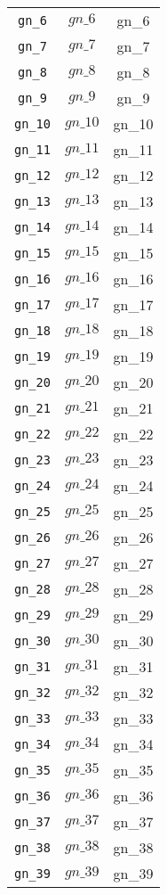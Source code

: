 \begin{center}
\begin{longtable}{ccc}
\texttt{gn\_6} & $gn\_6$ & gn\_6\\
\texttt{gn\_7} & $gn\_7$ & gn\_7\\
\texttt{gn\_8} & $gn\_8$ & gn\_8\\
\texttt{gn\_9} & $gn\_9$ & gn\_9\\
\texttt{gn\_10} & $gn\_10$ & gn\_10\\
\texttt{gn\_11} & $gn\_11$ & gn\_11\\
\texttt{gn\_12} & $gn\_12$ & gn\_12\\
\texttt{gn\_13} & $gn\_13$ & gn\_13\\
\texttt{gn\_14} & $gn\_14$ & gn\_14\\
\texttt{gn\_15} & $gn\_15$ & gn\_15\\
\texttt{gn\_16} & $gn\_16$ & gn\_16\\
\texttt{gn\_17} & $gn\_17$ & gn\_17\\
\texttt{gn\_18} & $gn\_18$ & gn\_18\\
\texttt{gn\_19} & $gn\_19$ & gn\_19\\
\texttt{gn\_20} & $gn\_20$ & gn\_20\\
\texttt{gn\_21} & $gn\_21$ & gn\_21\\
\texttt{gn\_22} & $gn\_22$ & gn\_22\\
\texttt{gn\_23} & $gn\_23$ & gn\_23\\
\texttt{gn\_24} & $gn\_24$ & gn\_24\\
\texttt{gn\_25} & $gn\_25$ & gn\_25\\
\texttt{gn\_26} & $gn\_26$ & gn\_26\\
\texttt{gn\_27} & $gn\_27$ & gn\_27\\
\texttt{gn\_28} & $gn\_28$ & gn\_28\\
\texttt{gn\_29} & $gn\_29$ & gn\_29\\
\texttt{gn\_30} & $gn\_30$ & gn\_30\\
\texttt{gn\_31} & $gn\_31$ & gn\_31\\
\texttt{gn\_32} & $gn\_32$ & gn\_32\\
\texttt{gn\_33} & $gn\_33$ & gn\_33\\
\texttt{gn\_34} & $gn\_34$ & gn\_34\\
\texttt{gn\_35} & $gn\_35$ & gn\_35\\
\texttt{gn\_36} & $gn\_36$ & gn\_36\\
\texttt{gn\_37} & $gn\_37$ & gn\_37\\
\texttt{gn\_38} & $gn\_38$ & gn\_38\\
\texttt{gn\_39} & $gn\_39$ & gn\_39\\

\end{longtable}
\end{center}
